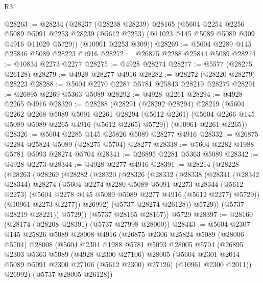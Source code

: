 \begin{lexlean}{R3}
\begin{coremodule}
@28263 := @28234
    (@28237
      (@28238 @28239)
      @28165
      (@5604
        @2254
        @2256
        @5089
        @5091
        @2253
        @28239
        (@5612 @2253)
        (@11023 @145 @5089 @5089 @309 @4916 @11029 @5729))
      (@10961 @2253 @309))
@28269 := @5604 @2289 @145 @25846 @5089 @28223 @4916
@28272 := @26875 @2288 @25844 @5089
@28274 := @10834 @2273 @2277
@28275 := @4928 @28274
@28277 := @5577 (@28275 @26128)
@28279 := @4928 @28277 @4916
@28282 := @28272 (@28220 @28279) @28223
@28288 := @5604 @2270 @2287 @5781 @25843 @28219 @28279
@28291 := @26895 @2269 @5363 @5089
@28292 := @4928 @2261
@28294 := @4928 @2265 @4916
@28320 := @28288
    (@28291
      (@28292 @28294)
      @28219
      (@5604
        @2262
        @2268
        @5089
        @5091
        @2261
        @28294
        (@5612 @2261)
        (@5604 @2266 @145 @5089 @5089 @2265 @4916 (@5612 @2265) @5729))
      (@10961 @2261 @2265))
@28326 := @5604 @2285 @145 @25826 @5089 @28277 @4916
@28332 := @26875 @2284 @25824 @5089 (@28275 @5704) @28277
@28338 := @5604 @2282 @1988 @5781 @5093 @28274 @5704
@28341 := @26895 @2281 @5363 @5089
@28342 := @4928 @2273
@28344 := @4928 @2277 @4916
@28391 := @28214
    (@28228
      (@28263
        (@28269
          (@28282
            (@28320
              (@28326
                (@28332
                  (@28338
                    (@28341
                      (@28342 @28344)
                      @28274
                      (@5604
                        @2274
                        @2280
                        @5089
                        @5091
                        @2273
                        @28344
                        (@5612 @2273)
                        (@5604 @2278 @145 @5089 @5089 @2277 @4916 (@5612 @2277) @5729))
                      (@10961 @2273 @2277))
                    @26992)
                  (@5737 @28274 @26128))
                @5729))
            (@5737 @28219 @28221))
          @5729))
      (@5737 @28165 @28167))
    @5729
@28397 := @28160 (@28174 (@28208 @28391) (@5737 @27998 @28000))
@28443 := @5604
    @2307
    @145
    @25826
    @5089
    @28008
    @4916
    (@26875
      @2306
      @25824
      @5089
      (@28006 @5704)
      @28008
      (@5604
        @2304
        @1988
        @5781
        @5093
        @28005
        @5704
        (@26895
          @2303
          @5363
          @5089
          (@4928 @2300 @27106)
          @28005
          (@5604 @2301 @2014 @5089 @5091 @2300 @27106 (@5612 @2300) @27126)
          (@10961 @2300 @2011))
        @26992)
      (@5737 @28005 @26128))

\end{coremodule}
\end{lexlean}
